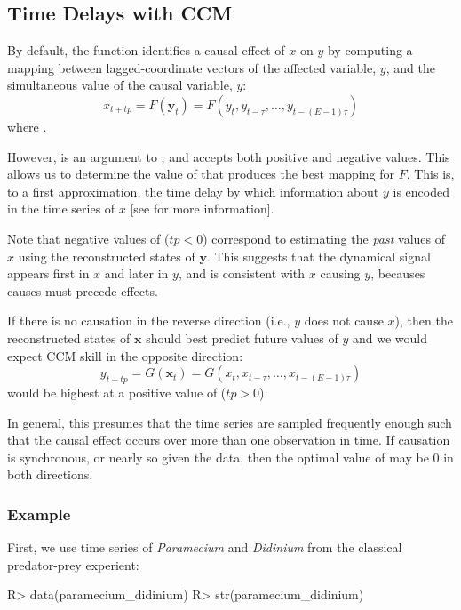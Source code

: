 \documentclass[article]{jss}
\begin{document}
\subsection{Time Delays with CCM}\label{sec:ccm-time-delays}

By default, the  function identifies a causal effect of $x$ on $y$ by computing a mapping between lagged-coordinate vectors of the affected variable, $y$, and the simultaneous value of the causal variable, $y$:
\begin{equation}
x_{t+tp} = F\left(\mathbf{y}_t\right) = F\left(y_t, y_{t-\tau}, \dots, y_{t-(E-1)\tau} \right)
\end{equation}
where .

However,  is an argument to , and accepts both positive and negative values. This allows us to determine the value of  that produces the best mapping for $F$. This is, to a first approximation, the time delay by which information about $y$ is encoded in the time series of $x$ [see \citet{Ye_2015a} for more information].

Note that negative values of  ($tp < 0$) correspond to estimating the \emph{past} values of $x$ using the reconstructed states of $\mathbf{y}$. This suggests that the dynamical signal appears first in $x$ and later in $y$, and is consistent with $x$ causing $y$, becauses causes must precede effects.

If there is no causation in the reverse direction (i.e., $y$ does not cause $x$), then the reconstructed states of $\mathbf{x}$ should best predict future values of $y$ and we would expect CCM skill in the opposite direction:
$$ y_{t+tp} = G\left(\mathbf{x}_t\right) = G\left(x_t, x_{t-\tau}, \dots, x_{t-(E-1)\tau} \right) $$
would be highest at a positive value of  ($tp > 0$).

In general, this presumes that the time series are sampled frequently enough such that the causal effect occurs over more than one observation in time. If causation is synchronous, or nearly so given the data, then the optimal value of  may be $0$ in both directions.

\subsubsection{Example}\label{sec:ccm-time-delays-example}

First, we use time series of \emph{Paramecium} and \emph{Didinium} from the classical predator-prey experient:
\begin{Schunk}
\begin{Sinput}
R> data(paramecium_didinium)
R> str(paramecium_didinium)
\end{Sinput}
\end{Schunk}
\end{document}
